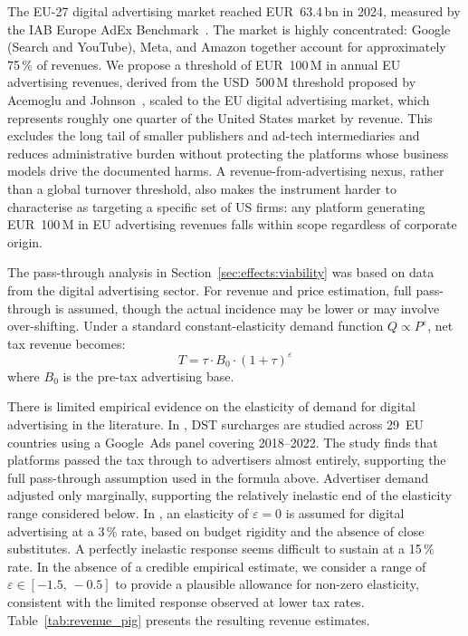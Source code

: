 \documentclass[../../main]{subfiles}
\begin{document}
The EU-27 digital advertising market reached EUR~63.4\,bn in 2024, measured by the IAB Europe AdEx Benchmark~\citep{iab_adex_2024}.
The market is highly concentrated: Google (Search and YouTube), Meta, and Amazon together account for approximately 75\,\% of revenues.
We propose a threshold of EUR~100\,M in annual EU advertising revenues, derived from the USD~500\,M threshold proposed by Acemoglu and Johnson~\citep{acemoglu_johnson_2024_ad_tax}, %
scaled to the EU digital advertising market, which represents roughly one quarter of the United States market by revenue.
This excludes the long tail of smaller publishers and ad-tech intermediaries and reduces administrative burden without protecting the platforms whose business models drive the documented harms.
A revenue-from-advertising nexus, rather than a global turnover threshold, also makes the instrument harder to characterise as targeting a specific set of US firms: any platform generating EUR~100\,M in EU advertising revenues falls within scope regardless of corporate origin.

The pass-through analysis in Section~\ref{sec:effects:viability} was based on data from the digital advertising sector.
For revenue and price estimation, full pass-through is assumed, though the actual incidence may be lower or may involve over-shifting.
Under a standard constant-elasticity demand function $Q \propto P^{\varepsilon}$, net tax revenue becomes:
\[
T = \tau \cdot B_0 \cdot \left(1+\tau\right)^{\varepsilon}
\]
where $B_0$ is the pre-tax advertising base.

There is limited empirical evidence on the elasticity of demand for digital advertising in the literature.
In \citet{acun_kasinger_2025}, DST surcharges are studied across 29~EU countries using a Google~Ads panel covering 2018--2022.
The study finds that platforms passed the tax through to advertisers almost entirely, supporting the full pass-through assumption used in the formula above.
Advertiser demand adjusted only marginally, supporting the relatively inelastic end of the elasticity range considered below.
In \citet{pellefigue_2019}, an elasticity of $\varepsilon = 0$ is assumed for digital advertising at a 3\,\% rate, based on budget rigidity and the absence of close substitutes.
A perfectly inelastic response seems difficult to sustain at a 15\,\% rate.
In the absence of a credible empirical estimate, we consider a range of $\varepsilon \in [-1.5,\,-0.5]$ to provide a plausible allowance for non-zero elasticity, consistent with the limited response observed at lower tax rates.
Table~\ref{tab:revenue_pig} presents the resulting revenue estimates.
\end{document}
